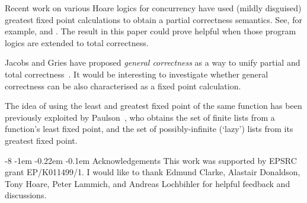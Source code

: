 \documentclass{llncs}
\makeatletter
\renewcommand\paragraph[1]{%
\@startsection{paragraph}{3}{\z@}%
{-8\p@ \@plus -4\p@ \@minus -4\p@}%
{-1em \@plus -0.22em \@minus -0.1em}%
{\normalfont\normalsize\bfseries\boldmath}{#1}}
\makeatother
\begin{document}
Recent work on various Hoare logics for concurrency have used (mildly
disguised) greatest fixed point calculations to obtain a partial
correctness semantics. See, for example,
\cite[Definition~3.2]{vafeiadis11} and
\cite[Definition~25]{dinsdale-young+13}. The result in this paper
could prove helpful when those program logics are extended to total
correctness.

Jacobs and Gries have proposed \emph{general correctness} as a way to
unify partial and total correctness~\cite{jacobs+85}. It would be
interesting to investigate whether general correctness can be also
characterised as a fixed point calculation.

The idea of using the least and greatest fixed point of the same
function has been previously exploited by
Paulson~\cite[\S3]{paulson97a}, who obtains the set of finite lists
from a function's least fixed point, and the set of possibly-infinite
(`lazy') lists from its greatest fixed point.

\paragraph{Acknowledgements} This work was supported by EPSRC grant
EP/K011499/1. I would like to thank Edmund Clarke, Alastair Donaldson,
Tony Hoare, Peter Lammich, and Andreas Lochbihler for helpful feedback
and discussions.



\end{document}
